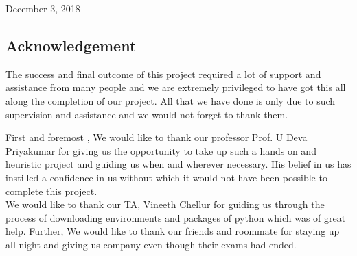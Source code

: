 \documentclass[12pt]{article}%
\begin{document}
\begin{titlepage}
	
	
	\vfill\vfill\vfill %
	
	{\large December 3, 2018} %
	
	
	 
	
	\vfill %
	
\end{titlepage}
\newpage
\tableofcontents
\newpage



\begin{center}
\section*{Acknowledgement}
\end{center}

\vspace{10mm}

\begin{center}
The success and final outcome of this project required a lot of support and assistance from many people and we are extremely privileged to have got this all along the completion of our project. All that we have done is only due to such supervision and assistance and we would not forget to thank them. \\
\vspace{10mm}

First and foremost , We would like to thank our professor Prof. U Deva Priyakumar for giving us the opportunity to take up such a hands on and heuristic project and guiding us when and wherever necessary. His belief in us has instilled a confidence in us without which it would not have been possible to complete this project. \\ 
\vspace{10mm	}
We would like to thank our TA, Vineeth Chellur for guiding us through the process of downloading environments and packages of python which was of great help.
Further, We would like to thank our friends and roommate for staying up all night and giving us company even though their exams had ended.
\end{center}
\end{document}
